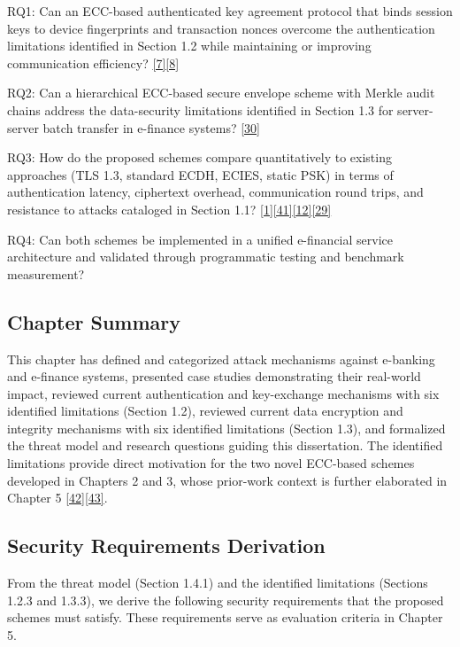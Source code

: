 \indent RQ1: Can an ECC-based authenticated key agreement protocol that binds session keys to device fingerprints and transaction nonces overcome the authentication limitations identified in Section 1.2 while maintaining or improving communication efficiency? \hyperref[ref:7]{[7]}\hyperref[ref:8]{[8]}

\indent RQ2: Can a hierarchical ECC-based secure envelope scheme with Merkle audit chains address the data-security limitations identified in Section 1.3 for server-server batch transfer in e-finance systems? \hyperref[ref:30]{[30]}

\indent RQ3: How do the proposed schemes compare quantitatively to existing approaches (TLS 1.3, standard ECDH, ECIES, static PSK) in terms of authentication latency, ciphertext overhead, communication round trips, and resistance to attacks cataloged in Section 1.1? \hyperref[ref:1]{[1]}\hyperref[ref:41]{[41]}\hyperref[ref:12]{[12]}\hyperref[ref:29]{[29]}

\indent RQ4: Can both schemes be implemented in a unified e-financial service architecture and validated through programmatic testing and benchmark measurement?

\subsection{Chapter Summary}

\indent This chapter has defined and categorized attack mechanisms against e-banking and e-finance systems, presented case studies demonstrating their real-world impact, reviewed current authentication and key-exchange mechanisms with six identified limitations (Section 1.2), reviewed current data encryption and integrity mechanisms with six identified limitations (Section 1.3), and formalized the threat model and research questions guiding this dissertation. The identified limitations provide direct motivation for the two novel ECC-based schemes developed in Chapters 2 and 3, whose prior-work context is further elaborated in Chapter 5 \hyperref[ref:42]{[42]}\hyperref[ref:43]{[43]}.

\subsection{Security Requirements Derivation}

\indent From the threat model (Section 1.4.1) and the identified limitations (Sections 1.2.3 and 1.3.3), we derive the following security requirements that the proposed schemes must satisfy. These requirements serve as evaluation criteria in Chapter 5.

